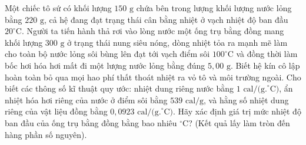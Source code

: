 \begin{ex}%
	Một chiếc tô sứ có khối lượng $150\text{ g}$ chứa bên trong lượng khối lượng nước lỏng bằng $220\text{ g}$, cả hệ đang đạt trạng thái cân bằng nhiệt ở vạch nhiệt độ ban đầu $20^\circ\text{C}$. Người ta tiến hành thả rơi vào lòng nước một ống trụ bằng đồng mang khối lượng $300\text{ g}$ ở trạng thái nung siêu nóng, dòng nhiệt tỏa ra mạnh mẽ làm cho toàn bộ nước lỏng sôi bùng lên đạt tới vạch điểm sôi $100^\circ\text{C}$ và đồng thời làm bốc hơi hóa hơi mất đi một lượng nước lỏng bằng đúng $5,00\text{ g}$. Biết hệ kín cô lập hoàn toàn bỏ qua mọi hao phí thất thoát nhiệt ra vỏ tô và môi trường ngoài. Cho biết các thông số kĩ thuật quy ước: nhiệt dung riêng nước bằng $1\text{ cal/(g.}^\circ\text{C)}$, ẩn nhiệt hóa hơi riêng của nước ở điểm sôi bằng $539\text{ cal/g}$, và hằng số nhiệt dung riêng của vật liệu đồng bằng $0,0923\text{ cal/(g.}^\circ\text{C)}$. Hãy xác định giá trị mức nhiệt độ ban đầu của ống trụ bằng đồng bằng bao nhiêu $^\circ\text{C}$? (Kết quả lấy làm tròn đến hàng phần số nguyên).
\end{ex}

